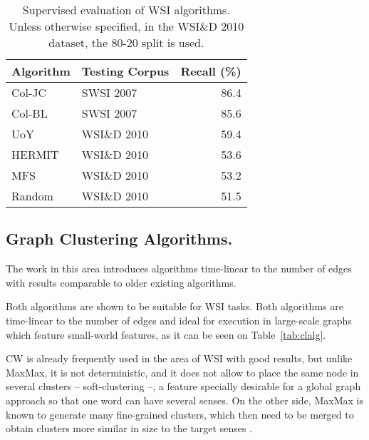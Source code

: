\begin{table}
\centering
\caption[Supervised evaluation of \acl*{WSI} algorithms]
{Supervised evaluation of \ac{WSI} algorithms. Unless otherwise specified, in
the WSI\&D 2010 dataset, the 80-20 split is used.}
\label{tab:wsi}

\begin{tabu} to \textwidth { Xlr }
\hline
\textbf{Algorithm} & \textbf{Testing Corpus} & \textbf{Recall} (\%)\\
\hline
Col-JC \cite{klapaftis2008word}           & \ac{SWSI} 2007 & 86.4 \\
Col-BL \cite{klapaftis2008word}           & \ac{SWSI} 2007 & 85.6 \\
UoY \cite{korkontzelos2010uoy}            & WSI\&D 2010    & 59.4 \\
HERMIT \cite{jurgens2010hermit}           & WSI\&D 2010    & 53.6 \\
\hline
MFS \cite{manandhar2010semeval}           & WSI\&D 2010    & 53.2 \\
Random \cite{manandhar2010semeval}        & WSI\&D 2010    & 51.5 \\
\hline
\end{tabu}
\end{table}

\subsection{Graph Clustering Algorithms.}

The work in this area introduces algorithms time-linear to the number of edges
with results comparable to older existing algorithms.

Both algorithms are shown to be suitable for \ac{WSI} tasks. Both algorithms are
time-linear to the number of edges and ideal for execution in large-scale graphs
which feature small-world features, as it can be seen on Table~\ref{tab:clalg}.

\ac{CW} is already frequently used in the area of \ac{WSI} with good results,
but unlike MaxMax, it is not deterministic, and it does not allow to place the
same node in several clusters -- soft-clustering --, a feature specially
desirable for a global graph approach so that one word can have several senses.
On the other side, MaxMax is known to generate many fine-grained clusters, which
then need to be merged to obtain clusters more similar in size to the target
senses \cite{hope2013uos}.

